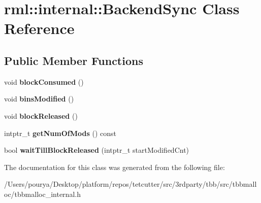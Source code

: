 \hypertarget{classrml_1_1internal_1_1BackendSync}{}\section{rml\+:\+:internal\+:\+:Backend\+Sync Class Reference}
\label{classrml_1_1internal_1_1BackendSync}
\subsection*{Public Member Functions}
\begin{DoxyCompactItemize}
\item 
\hypertarget{classrml_1_1internal_1_1BackendSync_a72efc4d2873a4c19a353328c3d73ab99}{}void {\bfseries block\+Consumed} ()\label{classrml_1_1internal_1_1BackendSync_a72efc4d2873a4c19a353328c3d73ab99}

\item 
\hypertarget{classrml_1_1internal_1_1BackendSync_a6965beddec2da0c9946a7d93e9538f05}{}void {\bfseries bins\+Modified} ()\label{classrml_1_1internal_1_1BackendSync_a6965beddec2da0c9946a7d93e9538f05}

\item 
\hypertarget{classrml_1_1internal_1_1BackendSync_aab6c480c19f732ef46072b09d11255b0}{}void {\bfseries block\+Released} ()\label{classrml_1_1internal_1_1BackendSync_aab6c480c19f732ef46072b09d11255b0}

\item 
\hypertarget{classrml_1_1internal_1_1BackendSync_a5574d494e9f743c3877d094e985a4394}{}intptr\+\_\+t {\bfseries get\+Num\+Of\+Mods} () const \label{classrml_1_1internal_1_1BackendSync_a5574d494e9f743c3877d094e985a4394}

\item 
\hypertarget{classrml_1_1internal_1_1BackendSync_a6bed4b206adc3c9623149f564fce7704}{}bool {\bfseries wait\+Till\+Block\+Released} (intptr\+\_\+t start\+Modified\+Cnt)\label{classrml_1_1internal_1_1BackendSync_a6bed4b206adc3c9623149f564fce7704}

\end{DoxyCompactItemize}


The documentation for this class was generated from the following file\+:\begin{DoxyCompactItemize}
\item 
/\+Users/pourya/\+Desktop/platform/repos/tetcutter/src/3rdparty/tbb/src/tbbmalloc/tbbmalloc\+\_\+internal.\+h\end{DoxyCompactItemize}
